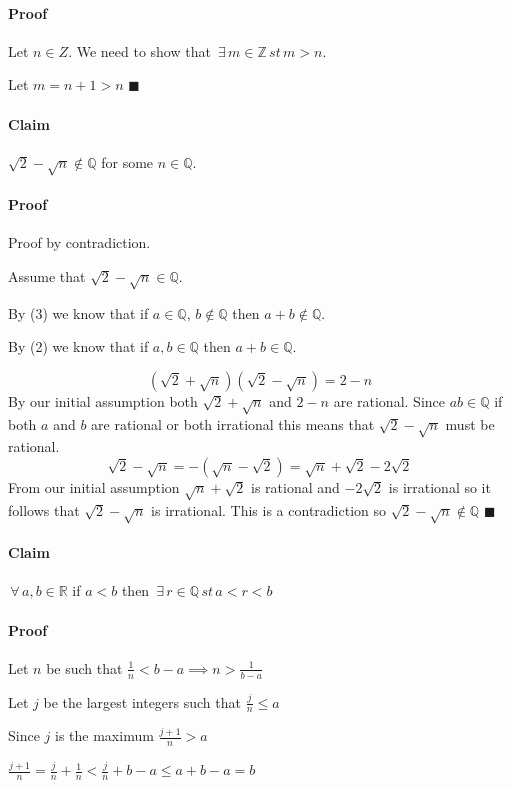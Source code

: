\documentclass{article}
\newcommand{\bb}[1]{\mathbb{#1}}
\newcommand{\A}{\,\forall\,}
\newcommand{\E}{\,\exists\,}
\begin{document}
\paragraph{Proof} Let \(n\in Z\). We need to show that \(\E m\in\bb Z\,st\,m>n\).

Let \(m=n+1>n\) \(\blacksquare\)

\paragraph{Claim} \(\sqrt{2} - \sqrt{n} \notin \bb{Q}\) for some \(n \in \bb{Q}\).

\paragraph{Proof} Proof by contradiction.

Assume that \(\sqrt{2} - \sqrt{n} \in \bb{Q}\).

By (3) we know that if \(a\in\bb Q,\,b\notin\bb Q\) then \(a+b\notin\bb Q\).

By (2) we know that if \(a,b\in\bb Q\) then \(a+b\in\bb Q\).

\[(\sqrt 2+\sqrt n)(\sqrt 2-\sqrt n)=2-n\]
By our initial assumption both \(\sqrt 2+\sqrt n\) and \(2-n\) are rational. Since \(ab\in\bb Q\) if both \(a\) and \(b\) are rational or both irrational this means that \(\sqrt 2-\sqrt n\) must be rational.
\[\sqrt 2-\sqrt n=-(\sqrt n-\sqrt 2)=\sqrt n+\sqrt 2-2\sqrt 2\]
From our initial assumption \(\sqrt n+\sqrt 2\) is rational and \(-2\sqrt2\) is irrational so it follows that \(\sqrt 2-\sqrt n\) is irrational. This is a contradiction so \(\sqrt 2-\sqrt n\notin\bb Q\) \(\blacksquare\)

\paragraph{Claim} \(\A a,b\in\bb R\) if \(a<b\) then \(\E r\in\bb Q\,st\,a<r<b\)

\paragraph{Proof} Let \(n\) be such that \(\frac1n<b-a\implies n>\frac{1}{b-a}\)

Let \(j\) be the largest integers such that \(\frac jn\le a\)

Since \(j\) is the maximum \(\frac{j+1}{n}>a\)

\(\frac{j+1}{n}=\frac jn+\frac1n<\frac jn+b-a\le a+b-a=b\)
\end{document}
